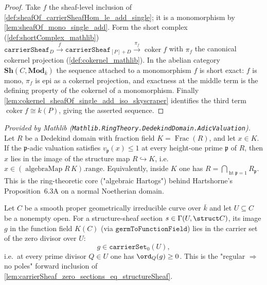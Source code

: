 \begin{proof}
  Take \(f\) the sheaf-level inclusion of
  \cref{def:sheafOf_carrierSheafHom_le_add_single}; it is a monomorphism by
  \cref{lem:sheafOf_mono_single_add}. Form the short complex
  (\cref{def:shortComplex_mathlib})
  \(\texttt{carrierSheaf}_D \xrightarrow{f} \texttt{carrierSheaf}_{[P]+D}
  \xrightarrow{\pi_f} \operatorname{coker} f\) with \(\pi_f\) the canonical
  cokernel projection (\cref{def:cokernel_mathlib}). In the abelian category
  \(\mathbf{Sh}(C, \mathbf{Mod}_{\bar k})\) the sequence attached to a
  monomorphism \(f\) is short exact: \(f\) is mono, \(\pi_f\) is epi as a
  cokernel projection, and exactness at the middle term is the defining
  property of the cokernel of a monomorphism. Finally
  \cref{lem:cokernel_sheafOf_single_add_iso_skyscraper} identifies the third
  term \(\operatorname{coker} f \cong k(P)\), giving the asserted sequence.
\end{proof}

\begin{lemma}
  \label{lem:mem_integers_of_valuation_le_one}
  \mathlibok
  \textit{Provided by Mathlib (\texttt{Mathlib.RingTheory.DedekindDomain.AdicValuation}).}
  Let \(R\) be a Dedekind domain with fraction field
  \(K = \operatorname{Frac}(R)\), and let \(x \in K\). If the
  \(\mathfrak p\)-adic valuation satisfies \(v_{\mathfrak p}(x) \le 1\) at every
  height-one prime \(\mathfrak p\) of \(R\), then \(x\) lies in the image of the
  structure map \(R \hookrightarrow K\), i.e.\
  \(x \in (\operatorname{algebraMap} R\,K).\mathrm{range}\). Equivalently, inside
  \(K\) one has \(R = \bigcap_{\operatorname{ht}\mathfrak p = 1} R_{\mathfrak p}\).
  This is the ring-theoretic core ("algebraic Hartogs") behind
  Hartshorne's Proposition~6.3A on a normal Noetherian domain.
\end{lemma}

\begin{lemma}
  \label{lem:structureSection_mem_carrierSet_zero}
  \uses{def:sheafOf_carrierSet, def:order_at_point}
  Let \(C\) be a smooth proper geometrically irreducible curve over \(\bar k\)
  and let \(U \subseteq C\) be a nonempty open. For a structure-sheaf section
  \(s \in \Gamma(U, \struct C)\), its image \(g\) in the function field
  \(K(C)\) (via \(\texttt{germToFunctionField}\)) lies in the carrier set of the
  zero divisor over \(U\):
  \[
    g \in \texttt{carrierSet}_0(U),
  \]
  i.e.\ at every prime divisor \(Q \in U\) one has \(\ord_Q(g) \ge 0\). This is
  the "regular \(\Rightarrow\) no poles" forward inclusion of
  \cref{lem:carrierSheaf_zero_sections_eq_structureSheaf}.
\end{lemma}

